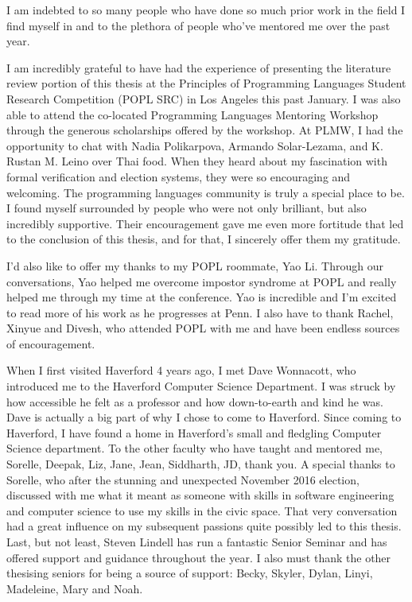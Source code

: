 
\cleardoublepage


\begin{acknowledgements}

I am indebted to so many people who have done so much prior work in
the field I find myself in and to the plethora of people who've mentored me over
the past year. 

I am incredibly grateful to have had the experience of presenting the literature
review portion of this thesis at the Principles of Programming Languages Student
Research Competition (POPL SRC) in Los Angeles this past January. I was also
able to attend the co-located Programming Languages Mentoring Workshop through
the generous scholarships offered by the workshop. At PLMW, I had the
opportunity to chat with Nadia Polikarpova, Armando Solar-Lezama, and K. Rustan
M. Leino over Thai food. When they heard about my fascination with formal
verification and election systems, they were so encouraging and welcoming. The
programming languages community is truly a special place to be. I found myself
surrounded by people who were not only brilliant, but also incredibly
supportive. Their encouragement gave me even more fortitude that led to the
conclusion of this thesis, and for that, I sincerely offer them my gratitude.

I'd also like to offer my thanks to my POPL roommate, Yao Li. Through our
conversations, Yao helped me overcome impostor syndrome at POPL and really
helped me through my time at the conference. Yao is incredible and I'm excited
to read more of his work as he progresses at Penn. I also have to thank Rachel,
Xinyue and Divesh, who attended POPL with me and have been endless sources of
encouragement. 

When I first visited Haverford 4 years ago, I met Dave Wonnacott, who introduced
me to the Haverford Computer Science Department. I was struck by how accessible
he felt as a professor and how down-to-earth and kind he was. Dave is actually a
big part of why I chose to come to Haverford. Since coming to Haverford, I have
found a home in Haverford's small and fledgling Computer Science department. To
the other faculty who have taught and mentored me, Sorelle, Deepak, Liz, Jane,
Jean, Siddharth, JD, thank you. A special thanks to Sorelle, who after the
stunning and unexpected November 2016 election, discussed with me what it meant
as someone with skills in software engineering and computer science to use my
skills in the civic space. That very conversation had a great influence on my
subsequent passions quite possibly led to this thesis. Last, but not least,
Steven Lindell has run a fantastic Senior Seminar and has offered support and
guidance throughout the year. I also must thank the other thesising seniors for
being a source of support: Becky, Skyler, Dylan, Linyi, Madeleine, Mary and
Noah. 


\end{acknowledgements}
